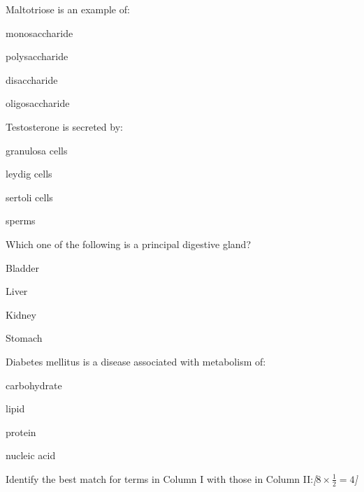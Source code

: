 \documentclass[11pt,a4paper]{article}
\newcommand{\pts}[1]{\hfill   \textit{[#1]}}
\begin{document}
\begin{parts}
\begin{parts}
    \item Maltotriose is an example of:
    
\begin{parts}
      \item monosaccharide
      \item polysaccharide
      \item disaccharide
      \item oligosaccharide
    \end{parts}

    \item Testosterone is secreted by:
    
\begin{parts}
      \item granulosa cells
      \item leydig cells
      \item sertoli cells
      \item sperms
    \end{parts}

    \item Which one of the following is a principal digestive gland?
    
\begin{parts}
      \item Bladder
      \item Liver
      \item Kidney
      \item Stomach
    \end{parts}

    \item Diabetes mellitus is a disease associated with metabolism of:
    
\begin{parts}
      \item carbohydrate
      \item lipid
      \item protein
      \item nucleic acid
    \end{parts}
  \end{parts}

  \item Identify the best match for terms in Column I with those in Column II:\pts{$8  \times \frac{1}{2} = 4$}
  
\begin{center}
    \renewcommand{\arraystretch}{1.2}
    

\end{center}
\end{parts}
\end{document}
